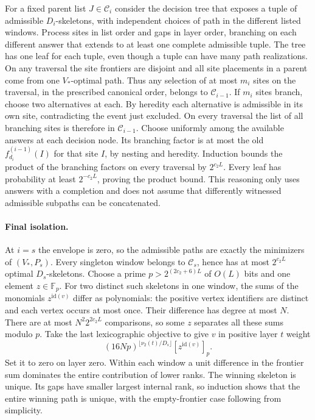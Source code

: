 \documentclass[11pt]{article}
\begin{document}
For a fixed parent list $J\in\mathcal C_i$ consider the decision tree
that exposes a tuple of admissible $D_i$-skeletons, with independent
choices of path in the different listed windows. Process sites in list
order and gaps in layer order, branching on each different answer
that extends to at least one complete admissible tuple. The tree has
one leaf for each tuple, even though a tuple can have many path
realizations. On any traversal the site frontiers are disjoint and all
site placements in a parent come from one $V_*$-optimal path. Thus any
selection of at most $m_i$ sites on the traversal, in the prescribed
canonical order, belongs to $\mathcal C_{i-1}$. If $m_i$ sites branch,
choose two alternatives at each. By heredity each alternative is
admissible in its own site, contradicting the event just excluded.
On every traversal the list of all branching sites is therefore in
$\mathcal C_{i-1}$. Choose uniformly among the available answers at
each decision node. Its branching factor is at most the old
$f_{d_i}^{(i-1)}(I)$ for that site $I$, by nesting and heredity.
Induction bounds the product of the branching factors on every traversal
by $2^{c_2 L}$. Every leaf has probability at least $2^{-c_2 L}$,
proving the product bound. This reasoning only uses answers with a
completion and does not assume that differently witnessed admissible
subpaths can be concatenated.

\paragraph{Final isolation.}
At $i=s$ the envelope is zero, so the admissible paths are exactly the
minimizers of $(V_*,P_s)$. Every singleton window belongs to
$\mathcal C_s$, hence has at most $2^{c_2L}$ optimal $D_s$-skeletons.
Choose a prime $p>2^{(2c_2+6)L}$ of $O(L)$ bits and one element
$z\in\mathbb F_p$. For two distinct such skeletons in one window,
the sums of the monomials $z^{\mathrm{id}(v)}$ differ as polynomials:
the positive vertex identifiers are distinct and each vertex occurs
at most once. Their difference has degree at most $N$. There are at
most $N^2 2^{2c_2 L}$ comparisons, so some $z$ separates all these
sums modulo $p$. Take the last lexicographic objective to give $v$ in
positive layer $t$ weight
\[
             (16Np)^{\lfloor\nu_2(t)/D_s\rfloor}
                     [z^{\mathrm{id}(v)}]_p .
\]
Set it to zero on layer zero. Within each window a unit difference in
the frontier sum dominates the entire contribution of lower ranks.
The winning skeleton is unique. Its gaps have smaller largest internal
rank, so induction shows that the entire winning path is unique, with
the empty-frontier case following from simplicity.
\end{document}
